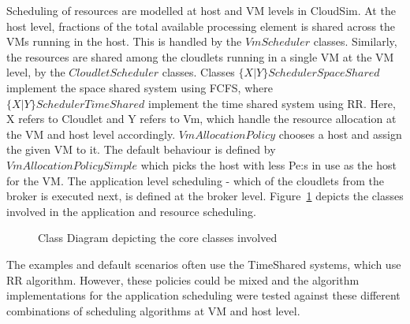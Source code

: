 \documentclass[times, 10pt,twocolumn]{article}
\begin{document}
Scheduling of resources are modelled at host and VM levels in CloudSim. At the host level, fractions of the total available processing element is shared across the VMs running in the host. This is handled by the $VmScheduler$ classes. Similarly, the resources are shared among the cloudlets running in a single VM at the VM level, by the $CloudletScheduler$ classes. Classes $\{X|Y\}SchedulerSpaceShared$ implement the space shared system using FCFS, where $\{X|Y\}SchedulerTimeShared$ implement the time shared system using RR. Here, X refers to Cloudlet and Y refers to Vm, which handle the resource allocation at the VM and host level accordingly. $VmAllocationPolicy$ chooses a host and assign the given VM to it. The default behaviour is defined by $VmAllocationPolicySimple$ which picks the host with less Pe:s in use as the host for the VM. The application level scheduling - which of the cloudlets from the broker is executed next, is defined at the broker level. Figure~\ref{fig:classdiagram} depicts the classes involved in the application and resource scheduling.
\begin{figure}[ht]
 \caption{Class Diagram depicting the core classes involved}
 \label{fig:classdiagram}
\end{figure}

The examples and default scenarios often use the TimeShared systems, which use RR algorithm. However, these policies could be mixed and the algorithm implementations for the application scheduling were tested against these different combinations of scheduling algorithms at VM and host level.
\end{document}
